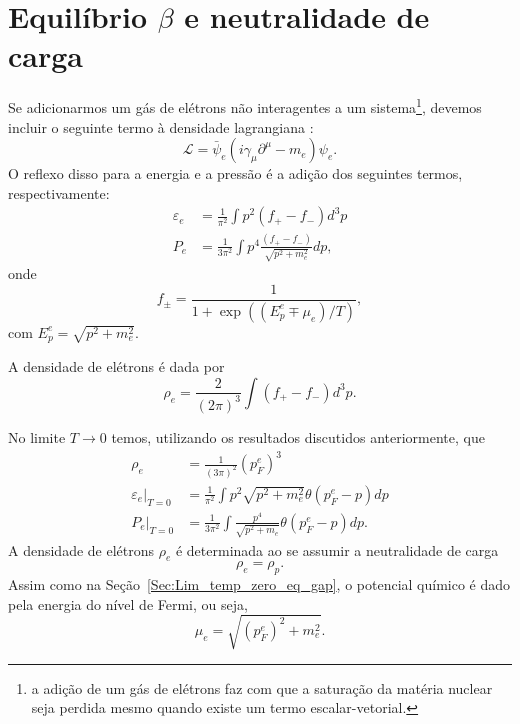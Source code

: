\section{Equilíbrio $\beta$ e neutralidade de carga}

Se adicionarmos um gás de elétrons não interagentes a um sistema\footnote{a adição de um gás de elétrons faz com que a saturação da matéria nuclear seja perdida mesmo quando existe um termo escalar-vetorial.}, devemos incluir o seguinte termo à densidade lagrangiana \parencite{CavagnoliTese}:
\begin{equation}
	\mathcal{L} = \bar\psi_e(i\gamma_\mu\partial^\mu - m_e)\psi_e.
\end{equation}
%
O reflexo disso para a energia e a pressão é a adição dos seguintes termos, respectivamente:
\begin{align}
	\varepsilon_e &= \frac{1}{\pi^2} \int p^2 (f_+ - f_-) d^3p \\
	P_e &= \frac{1}{3\pi^2}\int p^4 \frac{(f_+ - f_-)}{\sqrt{p^2 + m_e^2}} dp,
\end{align}
%
onde
\begin{equation}
	f_{\pm} = \frac{1}{1 + \exp((E_p^e \mp \mu_e)/T)},
\end{equation}
%
com $E_p^e = \sqrt{p^2 + m_e^2}$.

A densidade de elétrons é dada por
\begin{equation}
	\rho_e = \frac{2}{(2\pi)^3}\int (f_+ - f_-) d^3p.
\end{equation}

No limite $T \to 0$ temos, utilizando os resultados discutidos anteriormente, que
\begin{align}
	\rho_e &= \frac{1}{(3\pi)^2} (p_F^e)^3 \\
	\varepsilon_e |_{T = 0} &= \frac{1}{\pi^2} \int p^2 \sqrt{p^2 + m_e^2} \theta(p_F^e - p) dp \\
	P_e|_{T = 0} &= \frac{1}{3\pi^2} \int \frac{p^4}{\sqrt{p^2 + m_e}} \theta(p_F^e - p) dp.
\end{align}
%
A densidade de elétrons $\rho_e$ é determinada ao se assumir a neutralidade de carga
\begin{equation}
	\rho_e = \rho_p.
\end{equation}
%
Assim como na Seção~\ref{Sec:Lim_temp_zero_eq_gap}, o potencial químico é dado pela energia do nível de Fermi, ou seja,
\begin{equation}
	\mu_e = \sqrt{(p_F^e)^2 + m_e^2}.
\end{equation}

